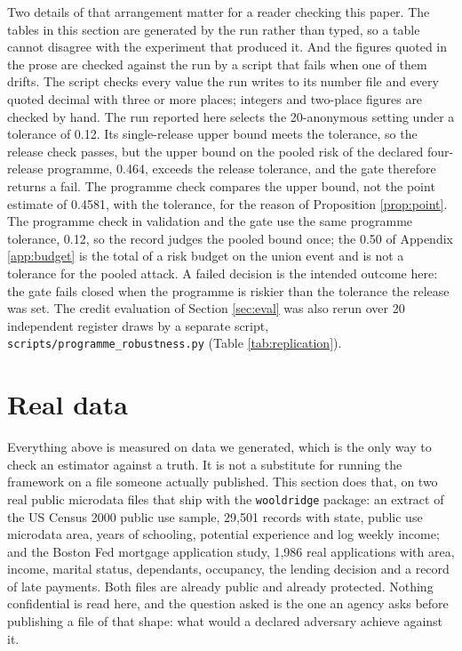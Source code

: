 \documentclass[11pt,a4paper]{article}
\theoremstyle{plain}
\theoremstyle{definition}
\theoremstyle{definition}
\theoremstyle{plain}
\begin{document}
Two details of that arrangement matter for a reader checking this paper. The
tables in this section are generated by the run rather than typed, so a table
cannot disagree with the experiment that produced it. And the figures quoted in
the prose are checked against the run by a script that fails when one of them
drifts. The script checks every value the run writes to its number file and every
quoted decimal with three or more places; integers and two-place figures are
checked by hand. The run reported here selects the 20-anonymous setting under a
tolerance of 0.12. Its single-release upper bound meets the tolerance, so the
release check passes, but the upper bound on the pooled risk of the declared
four-release programme, 0.464, exceeds the release tolerance, and the gate
therefore returns a fail. The programme check compares the upper bound, not the
point estimate of 0.4581, with the tolerance, for the reason of Proposition
\ref{prop:point}. The programme check in validation and the gate use the same
programme tolerance, 0.12, so the record judges the pooled bound once; the 0.50 of
Appendix \ref{app:budget} is the total of a risk budget on the union event and is
not a tolerance for the pooled attack. A failed
decision is the intended outcome here: the gate fails closed when the programme
is riskier than the tolerance the release was set. The credit evaluation of Section \ref{sec:eval}
was also rerun over 20 independent register draws by a separate script,
\texttt{scripts/programme\_robustness.py} (Table \ref{tab:replication}).

\section{Real data}\label{sec:real}

Everything above is measured on data we generated, which is the only way to check
an estimator against a truth. It is not a substitute for running the framework on
a file someone actually published. This section does that, on two real public
microdata files that ship with the \texttt{wooldridge} package: an extract of the
US Census 2000 public use sample, 29,501 records with state, public use microdata
area, years of schooling, potential experience and log weekly income; and the
Boston Fed mortgage application study, 1,986 real applications with area, income,
marital status, dependants, occupancy, the lending decision and a record of late
payments. Both files are already public and already protected. Nothing
confidential is read here, and the question asked is the one an agency asks before
publishing a file of that shape: what would a declared adversary achieve against
it.
\end{document}
